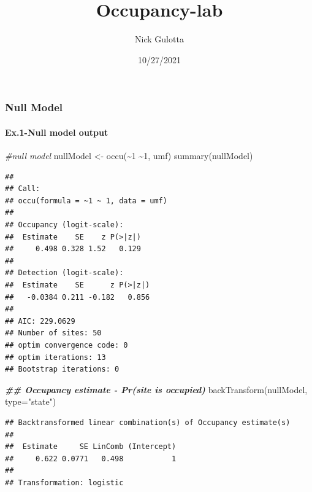 \documentclass[
]{article}
\title{Occupancy-lab}
\author{Nick Gulotta}
\date{10/27/2021}
\newenvironment{Shaded}{\begin{snugshade}}{\end{snugshade}}
\newcommand{\AttributeTok}[1]{\textcolor[rgb]{0.77,0.63,0.00}{#1}}
\newcommand{\CommentTok}[1]{\textcolor[rgb]{0.56,0.35,0.01}{\textit{#1}}}
\newcommand{\DecValTok}[1]{\textcolor[rgb]{0.00,0.00,0.81}{#1}}
\newcommand{\DocumentationTok}[1]{\textcolor[rgb]{0.56,0.35,0.01}{\textbf{\textit{#1}}}}
\newcommand{\FunctionTok}[1]{\textcolor[rgb]{0.00,0.00,0.00}{#1}}
\newcommand{\NormalTok}[1]{#1}
\newcommand{\OtherTok}[1]{\textcolor[rgb]{0.56,0.35,0.01}{#1}}
\newcommand{\SpecialCharTok}[1]{\textcolor[rgb]{0.00,0.00,0.00}{#1}}
\newcommand{\StringTok}[1]{\textcolor[rgb]{0.31,0.60,0.02}{#1}}
\begin{document}
\maketitle

\hypertarget{null-model}{%
\subsubsection{\texorpdfstring{\textbf{Null
Model}}{Null Model}}\label{null-model}}

\hypertarget{ex.1-null-model-output}{%
\paragraph{\texorpdfstring{\textbf{Ex.1-Null model
output}}{Ex.1-Null model output}}\label{ex.1-null-model-output}}

\begin{Shaded}
\begin{Highlighting}[]
\CommentTok{\#null model}
\NormalTok{nullModel }\OtherTok{\textless{}{-}} \FunctionTok{occu}\NormalTok{(}\SpecialCharTok{\textasciitilde{}}\DecValTok{1} \SpecialCharTok{\textasciitilde{}}\DecValTok{1}\NormalTok{, umf)}
\FunctionTok{summary}\NormalTok{(nullModel)}
\end{Highlighting}
\end{Shaded}

\begin{verbatim}
## 
## Call:
## occu(formula = ~1 ~ 1, data = umf)
## 
## Occupancy (logit-scale):
##  Estimate    SE    z P(>|z|)
##     0.498 0.328 1.52   0.129
## 
## Detection (logit-scale):
##  Estimate    SE      z P(>|z|)
##   -0.0384 0.211 -0.182   0.856
## 
## AIC: 229.0629 
## Number of sites: 50
## optim convergence code: 0
## optim iterations: 13 
## Bootstrap iterations: 0
\end{verbatim}

\begin{Shaded}
\begin{Highlighting}[]
\DocumentationTok{\#\# Occupancy estimate {-} Pr(site is occupied)}
\FunctionTok{backTransform}\NormalTok{(nullModel, }\AttributeTok{type=}\StringTok{"state"}\NormalTok{)}
\end{Highlighting}
\end{Shaded}

\begin{verbatim}
## Backtransformed linear combination(s) of Occupancy estimate(s)
## 
##  Estimate     SE LinComb (Intercept)
##     0.622 0.0771   0.498           1
## 
## Transformation: logistic
\end{verbatim}
\end{document}
